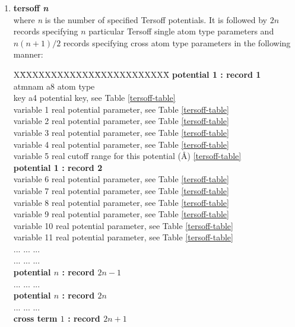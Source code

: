 \begin{enumerate}
\item {\bf tersoff {\em n}} \\
where {\em n} is the number of specified Tersoff potentials.  It
is followed by $2n$ records specifying $n$ particular Tersoff
single atom type parameters and $n(n+1)/2$ records specifying
cross atom type parameters in the following manner:
\begin{tabbing}
X\=XXXXXXXXXXXX\=XXXXXXXXXXXX\=\kill
{\bf potential 1 : record 1} \\
\> atmnam       \> a8   \> atom type \\
\> key          \> a4   \> potential key, see Table \ref{tersoff-table} \\
\> variable 1   \> real \> potential parameter, see Table \ref{tersoff-table} \\
\> variable 2   \> real \> potential parameter, see Table \ref{tersoff-table} \\
\> variable 3   \> real \> potential parameter, see Table \ref{tersoff-table} \\
\> variable 4   \> real \> potential parameter, see Table \ref{tersoff-table} \\
\> variable 5   \> real \> cutoff range for this potential (\AA) \ref{tersoff-table} \\
{\bf potential 1 : record 2} \\
\> variable 6   \> real \> potential parameter, see Table \ref{tersoff-table} \\
\> variable 7   \> real \> potential parameter, see Table \ref{tersoff-table} \\
\> variable 8   \> real \> potential parameter, see Table \ref{tersoff-table} \\
\> variable 9   \> real \> potential parameter, see Table \ref{tersoff-table} \\
\> variable 10  \> real \> potential parameter, see Table \ref{tersoff-table} \\
\> variable 11  \> real \> potential parameter, see Table \ref{tersoff-table} \\
\> ... \> ... \> ... \\
\> ... \> ... \> ... \\
{\bf potential $n$ : record $2n-1$} \\
\> ... \> ... \> ... \\
{\bf potential $n$ : record $2n$} \\
\> ... \> ... \> ... \\
{\bf cross term $1$ : record $2n+1$} \\

\end{tabbing}
\end{enumerate}
